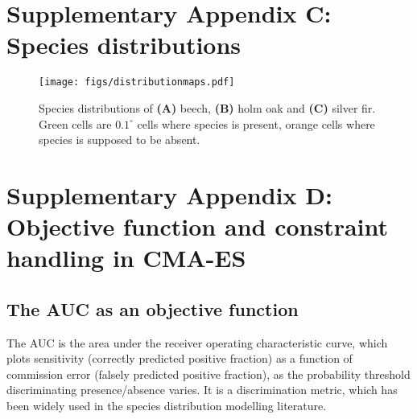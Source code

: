 \documentclass[11pt,]{article}
\begin{document}
\newpage

\newpage

\hypertarget{appendixC}{%
\section{Supplementary Appendix C: Species
distributions}\label{appendixC}}

\renewcommand*\thetable{C.\arabic{table}}
\renewcommand*\thefigure{C.\arabic{figure}}

\setcounter{figure}{0}
\setcounter{table}{0}

\renewcommand*{\thepage}{C--\arabic{page}}

\begin{figure}
\centering
\texttt{[image: figs/distributionmaps.pdf]}
\caption{Species distributions of \textbf{(A)} beech, \textbf{(B)} holm
oak and \textbf{(C)} silver fir. Green cells are \(0.1^\circ\) cells
where species is present, orange cells where species is supposed to be
absent.}
\end{figure}

\newpage

\hypertarget{appendixD}{%
\section{Supplementary Appendix D: Objective function and constraint
handling in CMA-ES}\label{appendixD}}

\renewcommand*\thetable{D.\arabic{table}}
\renewcommand*\thefigure{D.\arabic{figure}}

\setcounter{figure}{0}
\setcounter{table}{0}

\renewcommand*{\thepage}{D--\arabic{page}}

\hfill \break

\hypertarget{the-auc-as-an-objective-function}{%
\subsection{The AUC as an objective
function}\label{the-auc-as-an-objective-function}}

The AUC is the area under the receiver operating characteristic curve,
which plots sensitivity (correctly predicted positive fraction) as a
function of commission error (falsely predicted positive fraction), as
the probability threshold discriminating presence/absence varies. It is
a discrimination metric, which has been widely used in the species
distribution modelling literature.
\end{document}
